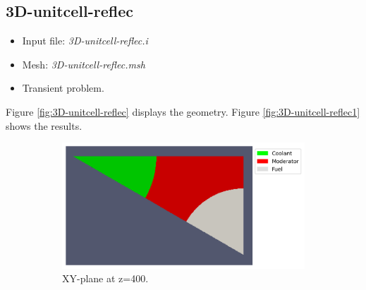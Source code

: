 \documentclass[11pt,letterpaper]{article}
\begin{document}
\subsection{3D-unitcell-reflec}

	\begin{itemize}
		\item Input file: \textit{3D-unitcell-reflec.i}
		\item Mesh: \textit{3D-unitcell-reflec.msh}
		\item Transient problem.
	\end{itemize}

Figure \ref{fig:3D-unitcell-reflec} displays the geometry.
Figure \ref{fig:3D-unitcell-reflec1} shows the results.

	\begin{figure}[htbp!]
		\centering
		\begin{subfigure}[t]{0.4\textwidth}
			\centering
			\includegraphics[width=\linewidth]{3D-unitcell-mesh1B}
			\caption{XY-plane at z=400.}
		\end{subfigure}
		\begin{subfigure}[t]{0.4\textwidth}
			\centering

\end{subfigure}
\end{figure}
\end{document}
